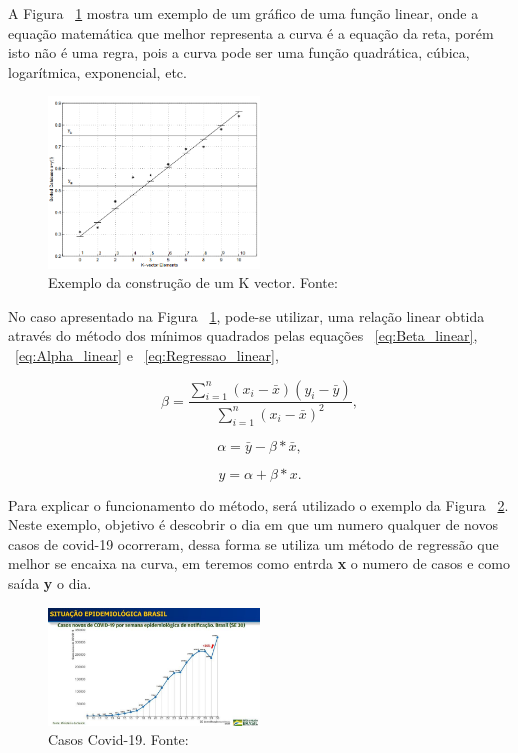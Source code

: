A Figura ~\ref{fig:K_vector} mostra um exemplo de um gráfico de uma função linear, onde a equação matemática que melhor representa a curva é a equação da reta, 
porém isto não é uma regra, pois a curva pode ser uma função quadrática, cúbica, logarítmica, exponencial, etc.
\begin{figure}[h]
	\centering
	\includegraphics[width=0.5\textwidth]{images/k_vector.png}
	\caption{Exemplo da construção de um K vector. Fonte: ~\cite[]{Mortari}}
	\label{fig:K_vector} 
\end{figure}

No caso apresentado na Figura ~\ref{fig:K_vector}, pode-se utilizar, uma relação linear obtida através do método dos mínimos quadrados pelas equações ~\ref{eq:Beta_linear}, ~\ref{eq:Alpha_linear} e ~\ref{eq:Regressao_linear},

\begin{equation}
	\beta = \frac{\sum_{i=1}^{n} (x_i - \bar{x})(y_i - \bar{y})}{\sum_{i=1}^{n} (x_i - \bar{x})^2},
	\label{eq:Beta_linear}
\end{equation}

\begin{equation}
	\alpha = \bar{y} - \beta * \bar{x},
	\label{eq:Alpha_linear}
\end{equation}

\begin{equation}
	y = \alpha + \beta * x
	\label{eq:Regressao_linear}.
\end{equation}

Para explicar o funcionamento do método, será utilizado o exemplo da Figura ~\ref{fig:covid_1}.
Neste exemplo, objetivo é descobrir o dia em que um numero qualquer de novos casos de covid-19 ocorreram,
dessa forma se utiliza um método de regressão que melhor se encaixa na curva, em teremos como entrda \textbf{x} o numero de casos e como saída \textbf{y} o dia.

\begin{figure}[H]
    \centering
    \includegraphics[width=0.5\textwidth]{images/covid_1.jpg}
    \caption{Casos Covid-19. Fonte: ~\cite[]{covid}}
    \label{fig:covid_1}
\end{figure}

